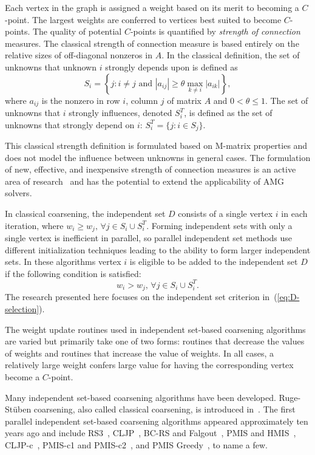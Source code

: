 \documentclass{elsart}
\begin{document}
Each vertex in the graph is assigned a weight based on its merit to
becoming a $C$-point. The largest weights are conferred to vertices
best suited to become $C$-points. The quality of potential $C$-points
is quantified by \emph{strength of connection} measures. The classical
strength of connection measure is based entirely on the relative sizes
of off-diagonal nonzeros in $A$. In the classical definition, the set
of unknowns that unknown $i$ strongly depends upon is defined as
\begin{equation}
\label{2:eqn:S_i}
S_i = \left\{j: i \ne j \textrm{ and }|a_{ij}| \ge \theta \max_{k \ne
i}|a_{ik}|\right\},
\end{equation}
where $a_{ij}$ is the nonzero in row $i$, column $j$ of matrix $A$ and
$0 < \theta \le 1$. The set of unknowns that $i$ strongly influences,
denoted $S_i^T$, is defined as the set of unknowns that strongly
depend on $i$: $S_i^T = \{j: i \in S_j\}$.

This classical strength definition is formulated based on M-matrix
properties and does not model the influence between unknowns in
general cases. The formulation of new, effective, and inexpensive
strength of connection measures is an active area of
research~\cite{Brannick2005} and has the potential to extend the
applicability of AMG solvers.

In classical coarsening, the independent set $D$ consists of a single
vertex $i$ in each iteration, where $w_i \ge w_j,\, \forall j \in S_i
\cup S_i^T$. Forming independent sets with only a single vertex is
inefficient in parallel, so parallel independent set methods use
different initialization techniques leading to the ability to form
larger independent sets. In these algorithms vertex $i$ is eligible to
be added to the independent set $D$ if the following condition is
satisfied:
\begin{equation}
  \label{eq:D-selection}
  w_i > w_j,\, \forall j \in S_i \cup S_i^T.
\end{equation}
The research presented here focuses on the independent set criterion
in~(\ref{eq:D-selection}).

The weight update routines used in independent set-based coarsening
algorithms are varied but primarily take one of two forms: routines
that decrease the values of weights and routines that increase the
value of weights. In all cases, a relatively large weight confers
large value for having the corresponding vertex become a $C$-point.

Many independent set-based coarsening algorithms have been
developed. Ruge-St\"uben coarsening, also called classical coarsening,
is introduced in~\cite{Ruge1987}. The first parallel independent
set-based coarsening algorithms appeared approximately ten years ago
and include RS3~\cite{Henson2002}, CLJP~\cite{Cleary1998}, BC-RS and
Falgout~\cite{Henson2002}, PMIS and HMIS~\cite{Sterck2006},
CLJP-c~\cite{alber-cljpc}, PMIS-c1 and PMIS-c2~\cite{alber-PCGS}, and
PMIS Greedy~\cite{Butler2006}, to name a few.
\end{document}
